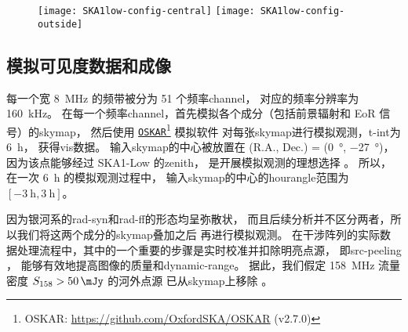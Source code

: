 \begin{figure}[htp]
  \centering
  \texttt{[image: SKA1low-config-central]}%
  \hfill%
  \texttt{[image: SKA1low-config-outside]}
  \label{fig:ska1low-config}
\end{figure}

\subsection{模拟可见度数据和成像}

每一个宽 \SI{8}{\MHz} 的频带被分为 51 个频率\ac{channel}，
对应的频率分辨率为 \SI{160}{\kHz}。
在每一个频率\ac{channel}，首先模拟各个成分（包括前景辐射和 EoR 信号）的\ac{skymap}，
然后使用 \href{https://github.com/OxfordSKA/OSKAR}{\texttt{OSKAR}}\footnote{%
  OSKAR: \url{https://github.com/OxfordSKA/OSKAR} (v2.7.0)}
模拟软件\cite{mort2010}
对每张\ac{skymap}进行模拟观测，\ac{t-int}为 \SI{6}{\hour}，
获得\ac{vis}数据。
输入\ac{skymap}的中心被放置在
(R.A., Dec.\@) = (\SI{0}{\degree}, \SI{-27}{\degree})，
因为该点能够经过 SKA1-Low 的\ac{zenith}，
是开展模拟观测的理想选择 \cite{liu2009ps,datta2010}。
所以，在一次 \SI{6}{\hour} 的模拟观测过程中，
输入\ac{skymap}的中心的\ac{hourangle}范围为 $[\SI{-3}{\hour}, \SI{3}{\hour}]$。

因为银河系的\ac{rad-syn}和\ac{rad-ff}的形态均呈弥散状，
而且后续分析并不区分两者，所以我们将这两个成分的\ac{skymap}叠加之后
再进行模拟观测。
在干涉阵列的实际数据处理流程中，其中的一个重要的步骤是实时校准并扣除明亮点源，
即\ac{src-peeling} \cite{noordam2004,mitchell2008,intema2009}，
能够有效地提高图像的质量和\ac{dynamic-range}。
据此，我们假定 \SI{158}{\MHz} 流量密度 $S_{158} > \SI{50}{\mJy}$ 的河外点源
已从\ac{skymap}上移除 \cite{liu2009ps,pindor2011,mort2017}。

